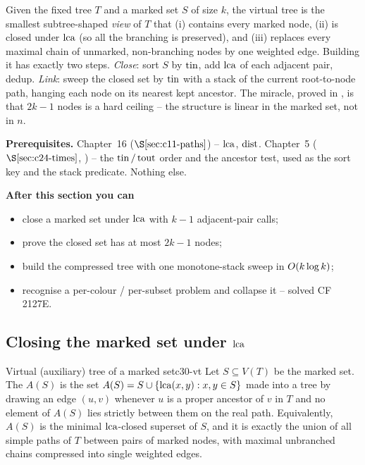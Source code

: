 \begin{topicintro}
Given the fixed tree \(T\) and a marked set \(S\) of size \(k\), the virtual tree is
the smallest subtree-shaped \emph{view} of \(T\) that (i) contains every marked node,
(ii) is closed under \(\operatorname{lca}\) (so all the branching is preserved), and (iii) replaces
every maximal chain of unmarked, non-branching nodes by one weighted edge.  Building
it has exactly two steps.  \emph{Close}: sort \(S\) by \(\operatorname{tin}\), add \(\operatorname{lca}\) of each
adjacent pair, dedup.  \emph{Link}: sweep the closed set by \(\operatorname{tin}\) with a stack of
the current root-to-node path, hanging each node on its nearest kept ancestor.  The
miracle, proved in , is that \(2k-1\) nodes is a hard ceiling -- the
structure is linear in the marked set, not in \(n\).

\textbf{Prerequisites.} Chapter~16 (\(\secref{c11-paths}\)) -- \(\operatorname{lca}\), \(\operatorname{dist}\).
Chapter~5 (\(\secref{c24-times}\), ) -- the \(\operatorname{tin}/\operatorname{tout}\) order and the
ancestor test, used as the sort key and the stack predicate.  Nothing else.

\textbf{After this section you can}
\begin{itemize}[nosep]
  \item close a marked set under \(\operatorname{lca}\) with \(k-1\) adjacent-pair calls; \hfill{}
  \item prove the closed set has at most \(2k-1\) nodes; \hfill{}
  \item build the compressed tree with one monotone-stack sweep in \(O(k\log k)\); \hfill{}
  \item recognise a per-colour / per-subset problem and collapse it -- solved CF 2127E. \hfill{}
\end{itemize}
\end{topicintro}

\subsection{Closing the marked set under \(\operatorname{lca}\)}

\begin{definition}{Virtual (auxiliary) tree of a marked set}{c30-vt}
Let \(S\subseteq V(T)\) be the marked set.  The  \(A(S)\) is the
set \(A(S)=S\cup\{\operatorname{lca}(x,y):x,y\in S\}\) made into a tree by drawing an edge
\((u,v)\) whenever \(u\) is a proper ancestor of \(v\) in \(T\) and no element of
\(A(S)\) lies strictly between them on the real path.  Equivalently, \(A(S)\) is the
minimal \(\operatorname{lca}\)-closed superset of \(S\), and it is exactly the union of all simple
paths of \(T\) between pairs of marked nodes, with maximal unbranched chains
compressed into single weighted edges.
\end{definition}


